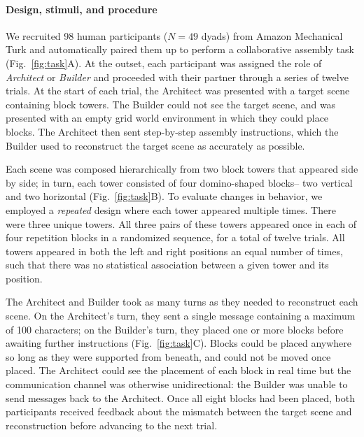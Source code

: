 \documentclass[10pt,letterpaper]{article}
\begin{document}
\paragraph{Design, stimuli, and procedure}
We recruited 98 human participants ($N=49$ dyads) from Amazon Mechanical Turk and automatically paired them up to perform a collaborative assembly task (Fig.~\ref{fig:task}A).
At the outset, each participant was assigned the role of \textit{Architect} or \textit{Builder} and proceeded with their partner through a series of twelve trials.
At the start of each trial, the Architect was presented with a target scene containing block towers. 
The Builder could not see the target scene, and was presented with an empty grid world environment in which they could place blocks.
The Architect then sent step-by-step assembly instructions, which the Builder used to reconstruct the target scene as accurately as possible. 

Each scene was composed hierarchically from two block towers that appeared side by side; in turn, each tower consisted of four domino-shaped blocks-- two vertical and two horizontal (Fig.~\ref{fig:task}B).
To evaluate changes in behavior, we employed a \emph{repeated} design where each tower appeared multiple times. 
There were three unique towers. 
All three pairs of these towers appeared once in each of four repetition blocks in a randomized sequence, for a total of twelve trials. %
All towers appeared in both the left and right positions an equal number of times, such that there was no statistical association between a given tower and its position.



The Architect and Builder took as many turns as they needed to reconstruct each scene.
On the Architect's turn, they sent a single message containing a maximum of 100 characters; 
on the Builder's turn, they placed one or more blocks before awaiting further instructions (Fig.~\ref{fig:task}C). 
Blocks could be placed anywhere so long as they were supported from beneath, and could not be moved once placed.
The Architect could see the placement of each block in real time but the communication channel was otherwise unidirectional: the Builder was unable to send messages back to the Architect.
Once all eight blocks had been placed, both participants received feedback about the mismatch between the target scene and reconstruction before advancing to the next trial.
\end{document}
